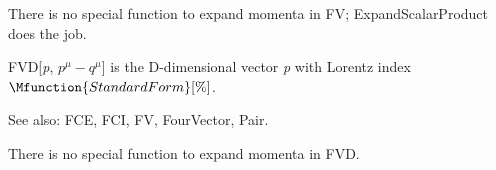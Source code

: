 \dispSFoutmath{
\mu
}







There is no special function to expand momenta in FV; ExpandScalarProduct does the job.







FVD[{\itshape p}, \({p^{\mu }}-{q^{\mu }}\)] is the D-dimensional vector {\itshape p} with Lorentz index \(\Mfunction{StandardForm}[\%]\).

See also:  FCE, FCI, FV, FourVector, Pair.



\dispSFoutmath{
\mu
}

\dispSFinmath{
\mu
}






There is no special function to expand momenta in FVD.


